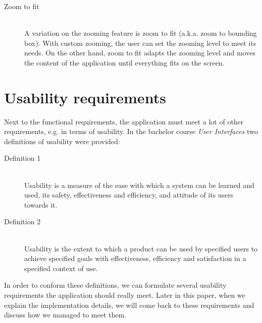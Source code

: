 \begin{description}
	\item[Zoom to fit] \hfill \\
	A variation on the zooming feature is zoom to fit (a.k.a. zoom to bounding box). With custom zooming, the user can set the zooming level to meet its needs. On the other hand, zoom to fit adapts the zooming level and moves the content of the application until everything fits on the screen. 
  
\end{description}




\section{Usability requirements}\label{sec:usability-requirements}
Next to the functional requirements, the application must meet a lot of other requirements, e.g. in terms of usability. In the bachelor course \textit{User Interfaces} \citep{ui_course_detroyer} two definitions of usability were provided:

\begin{description}
	\item[Definition 1] \hfill \\
	Usability is a measure of the ease with which a system can be learned and used, its safety, effectiveness and efficiency, and attitude of its users towards it.

	\item[Definition 2] \hfill \\
	Usability is the extent to which a product can be used by specified users to achieve specified goals with effectiveness, efficiency and satisfaction in a specified context of use.
\end{description}

In order to conform these definitions, we can formulate several usability requirements the application should really meet. Later in this paper, when we explain the implementation details, we will come back to these requirements and discuss how we managed to meet them.


